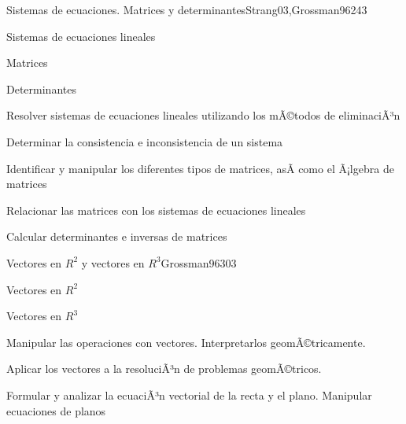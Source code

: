 \begin{syllabus}
\begin{unit}{Sistemas de ecuaciones. Matrices y determinantes}{Strang03,Grossman96}{24}{3}
   \begin{topics}
      \item Sistemas de ecuaciones lineales
      \item Matrices
      \item Determinantes
      \end{topics}

   \begin{learningoutcomes}
      \item Resolver sistemas de ecuaciones lineales utilizando los mÃ©todos de eliminaciÃ³n
      \item Determinar la consistencia e inconsistencia de un sistema
      \item Identificar y manipular los diferentes tipos de matrices, asÃ­ como el Ã¡lgebra de matrices
      \item Relacionar las matrices con los sistemas de ecuaciones lineales
      \item Calcular determinantes e inversas de matrices
   \end{learningoutcomes}
\end{unit}

\begin{unit}{Vectores en $R^2$ y vectores en $R^3$}{Grossman96}{30}{3}
   \begin{topics}
      \item Vectores en $R^2$
      \item Vectores en $R^3$
   \end{topics}

   \begin{learningoutcomes}
      \item Manipular las operaciones con vectores. Interpretarlos geomÃ©tricamente.
      \item Aplicar los vectores a la resoluciÃ³n de problemas geomÃ©tricos.
      \item Formular y analizar la ecuaciÃ³n vectorial de la recta y el plano. Manipular ecuaciones de planos
   \end{learningoutcomes}
\end{unit}



\begin{coursebibliography}
\end{coursebibliography}

\end{syllabus}
